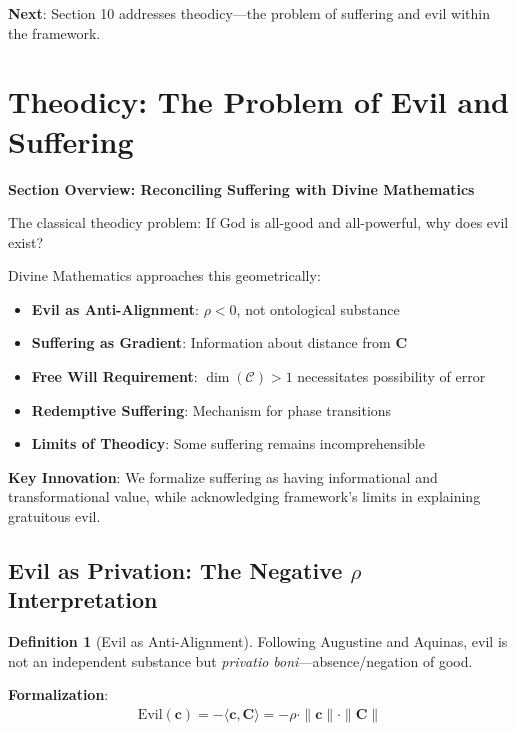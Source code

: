 \documentclass[11pt,a4paper]{article}
\theoremstyle{definition}
\newtheorem{definition}{Definition}[section]
\theoremstyle{remark}
\newcommand{\CC}{\mathcal{C}}
\newcommand{\cc}{\mathbf{c}}
\begin{document}
\begin{small}
\begin{enumerate}
\begin{mdframed}[backgroundcolor=green!10,linewidth=2pt,linecolor=green!70!black]
\textbf{Next}: Section 10 addresses theodicy—the problem of suffering and evil within the framework.
\end{mdframed}


\section{Theodicy: The Problem of Evil and Suffering}

\begin{mdframed}[backgroundcolor=cyan!5,linewidth=2pt]
\textbf{Section Overview: Reconciling Suffering with Divine Mathematics}

The classical theodicy problem: If God is all-good and all-powerful, why does evil exist?

Divine Mathematics approaches this geometrically:

\begin{itemize}[nosep]
    \item \textbf{Evil as Anti-Alignment}: \(\rho < 0\), not ontological substance
    \item \textbf{Suffering as Gradient}: Information about distance from \(\mathbf{C}\)
    \item \textbf{Free Will Requirement}: \(\dim(\CC) > 1\) necessitates possibility of error
    \item \textbf{Redemptive Suffering}: Mechanism for phase transitions
    \item \textbf{Limits of Theodicy}: Some suffering remains incomprehensible
\end{itemize}

\textbf{Key Innovation}: We formalize suffering as having informational and transformational value, while acknowledging framework's limits in explaining gratuitous evil.
\end{mdframed}

\subsection{Evil as Privation: The Negative \(\rho\) Interpretation}

\begin{definition}[Evil as Anti-Alignment]
Following Augustine and Aquinas, evil is not an independent substance but \textit{privatio boni}—absence/negation of good.

\textbf{Formalization}:
\begin{align}
\text{Evil}(\cc) = -\langle \cc, \mathbf{C} \rangle = -\rho \cdot \|\cc\| \cdot \|\mathbf{C}\|
\end{align}


\end{definition}
\end{enumerate}
\end{small}
\end{document}
